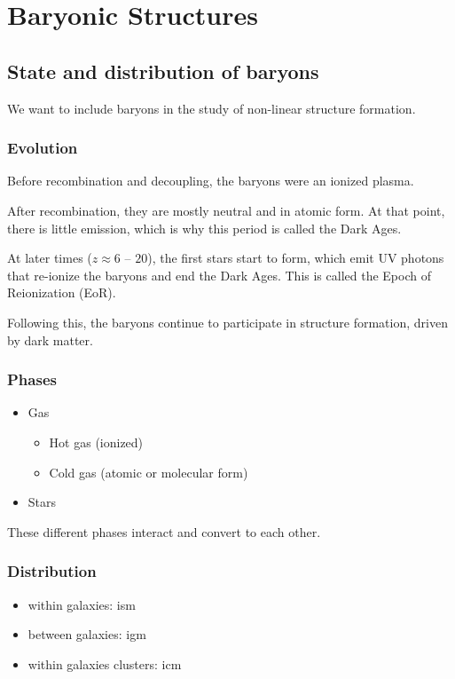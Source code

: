 \chapter{Baryonic Structures}


\section{State and distribution of baryons}


We want to include baryons in the study of non-linear structure formation.

\subsection{Evolution}
Before recombination and decoupling, the baryons were an ionized plasma.

After recombination, they are mostly neutral and in atomic form. At that point, there is little emission, which is why this period is called the Dark Ages.

At later times ($z \approx 6$ -- $20$), the first stars start to form, which emit UV photons that re-ionize the baryons and end the Dark Ages. This is called the Epoch of Reionization (EoR).

Following this, the baryons continue to participate in structure formation, driven by dark matter.



\subsection{Phases}

\begin{itemize}[nolistsep]
	\item Gas
	\begin{itemize}
		\item Hot gas (ionized)
		\item Cold gas (atomic or molecular form)
	\end{itemize}
	\item Stars
\end{itemize}
These different phases interact and convert to each other.



\subsection{Distribution}
\begin{itemize}
	\item within galaxies: \Ac{ism}
	\item between galaxies: \Ac{igm}
	\item within galaxies clusters: \Ac{icm}
\end{itemize}




